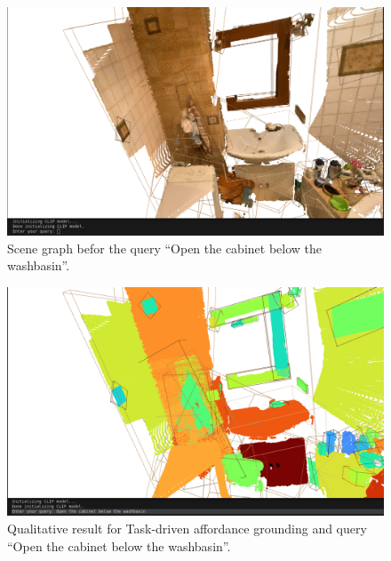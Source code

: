 \begin{figure}[ht!]
    \centering
    \includegraphics[width=\textwidth]{content/images/results/taskdrivenQ1.png}
    \caption{Scene graph befor the query \enquote{Open the cabinet below the washbasin}.}
    \label{fig:taskdrivenQ1}
\end{figure}

\begin{figure}[ht!]
    \centering
    \includegraphics[width=\textwidth]{content/images/results/taskdrivenA1.png}
    \caption{Qualitative result for Task-driven affordance grounding and query \enquote{Open the cabinet below the washbasin}.}
    \label{fig:taskdrivenA1}
\end{figure}

